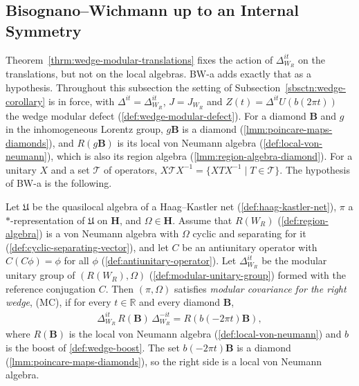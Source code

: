 \subsection{Bisognano--Wichmann up to an Internal Symmetry}\label{sbsctn:bw-internal}

Theorem~\ref{thrm:wedge-modular-translations} fixes the action of $\Delta_{W_R}^{it}$ on the translations, but not on the local algebras. BW-a adds exactly that as a hypothesis. Throughout this subsection the setting of Subsection~\ref{sbsctn:wedge-corollary} is in force, with $\Delta^{it} = \Delta_{W_R}^{it}$, $J = J_{W_R}$ and $Z(t) = \Delta^{it}U(b(2\pi t))$ the wedge modular defect (\ref{def:wedge-modular-defect}). For a diamond $\mathbf{B}$ and $g$ in the inhomogeneous Lorentz group, $g\mathbf{B}$ is a diamond (\ref{lmm:poincare-maps-diamonds}), and $R(g\mathbf{B})$ is its local von Neumann algebra (\ref{def:local-von-neumann}), which is also its region algebra (\ref{lmm:region-algebra-diamond}). For a unitary $X$ and a set $\mathcal{T}$ of operators, $X\mathcal{T}X^{-1} = \{ XTX^{-1} \mid T \in \mathcal{T} \}$. The hypothesis of BW-a is the following.

\begin{definition}
    \label{def:wedge-modular-covariance}
    \leanok
    Let $\mathfrak{U}$ be the quasilocal algebra of a Haag--Kastler net (\ref{def:haag-kastler-net}), $\pi$ a $*$-representation of $\mathfrak{U}$ on $\mathbf{H}$, and $\Omega \in \mathbf{H}$. Assume that $R(W_R)$ (\ref{def:region-algebra}) is a von Neumann algebra with $\Omega$ cyclic and separating for it (\ref{def:cyclic-separating-vector}), and let $C$ be an antiunitary operator with $C(C\phi) = \phi$ for all $\phi$ (\ref{def:antiunitary-operator}). Let $\Delta_{W_R}^{it}$ be the modular unitary group of $(R(W_R), \Omega)$ (\ref{def:modular-unitary-group}) formed with the reference conjugation $C$. Then $(\pi, \Omega)$ satisfies \emph{modular covariance for the right wedge}, (MC), if for every $t \in \mathbb{R}$ and every diamond $\mathbf{B}$,
    \begin{align}
        \Delta_{W_R}^{it}\,R(\mathbf{B})\,\Delta_{W_R}^{-it} = R(b(-2\pi t)\mathbf{B}),
    \end{align}
    where $R(\mathbf{B})$ is the local von Neumann algebra (\ref{def:local-von-neumann}) and $b$ is the boost of \ref{def:wedge-boost}. The set $b(-2\pi t)\mathbf{B}$ is a diamond (\ref{lmm:poincare-maps-diamonds}), so the right side is a local von Neumann algebra.
\end{definition}

